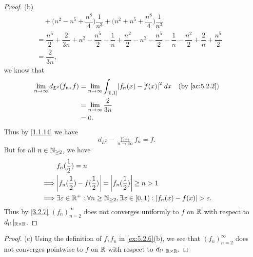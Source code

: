\begin{proof}{(b)}
\begin{align*}
     & \quad + \bigg(n^2 - n^5 + \dfrac{n^8}{4}\bigg) \dfrac{1}{n^3} + \bigg(n^2 + n^5 + \dfrac{n^8}{4}\bigg) \dfrac{1}{n^3}                                                                                                                                                                                          \\
     & = \dfrac{n^5}{2} + \dfrac{2}{3n} + n^2 - \dfrac{n^5}{2} - \dfrac{1}{n} + \dfrac{n^2}{2} - n^2 - \dfrac{n^5}{2} - \dfrac{1}{n} - \dfrac{n^2}{2} + \dfrac{2}{n} + \dfrac{n^5}{2}                                                                                                                                 \\
     & = \dfrac{2}{3n},
  \end{align*}
  we know that
  \begin{align*}
    \lim_{n \to \infty} d_{L^2}(f_n, f) & = \lim_{n \to \infty} \int_{[0, 1]} \abs{f_n(x) - f(x)}^2 \; dx &  & \by{ac:5.2.2} \\
                                        & = \lim_{n \to \infty} \dfrac{2}{3n}                                                \\
                                        & = 0.
  \end{align*}
  Thus by \cref{1.1.14} we have
  \[
    d_{L^2} - \lim_{n \to \infty} f_n = f.
  \]
  But for all \(n \in \mathbb{N}_{\geq 2}\), we have
  \begin{align*}
             & f_n(\dfrac{1}{2}) = n                                                                                                \\
    \implies & \abs{f_n(\dfrac{1}{2}) - f(\dfrac{1}{2})} = \abs{f_n(\dfrac{1}{2})} \geq n > 1                                       \\
    \implies & \exists \varepsilon \in \R^+ : \forall n \geq \N_{\geq 2}, \exists x \in [0, 1) : \abs{f_n(x) - f(x)} > \varepsilon.
  \end{align*}
  Thus by \cref{3.2.7} \((f_n)_{n = 2}^\infty\) does not converges uniformly to \(f\) on \(\mathbb{R}\) with respect to \(d_{l^1}|_{\mathbb{R} \times \mathbb{R}}\).
\end{proof}

\begin{proof}{(c)}
  Using the definition of \(f, f_n\) in \cref{ex:5.2.6}(b), we see that \((f_n)_{n = 2}^\infty\) does not converges pointwise to \(f\) on \(\mathbb{R}\) with respect to \(d_{l^1}|_{\mathbb{R} \times \mathbb{R}}\).
\end{proof}

